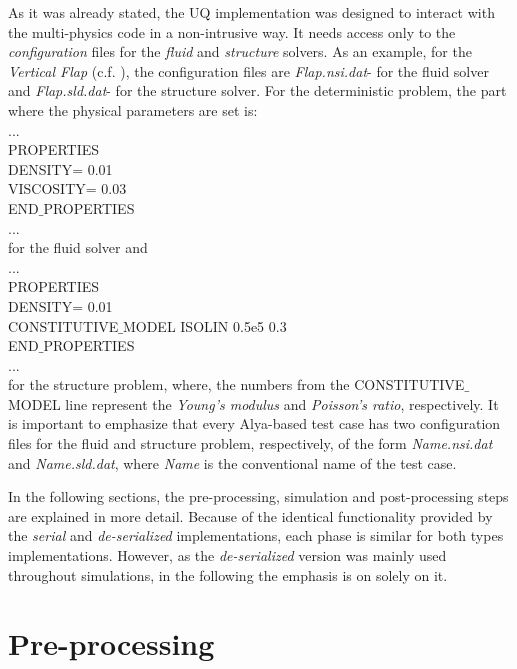 	As it was already stated, the UQ implementation was designed to interact with the multi-physics code in a non-intrusive way. It needs access only to the \emph{configuration} files for the \emph{fluid} and \emph{structure} solvers. As an example, for the \emph{Vertical Flap} (c.f. ), the configuration files are \emph{Flap.nsi.dat}- for the fluid solver and \emph{Flap.sld.dat}- for the structure solver. For the deterministic problem, the part where the physical parameters are set is:
\\
...
\\
 PROPERTIES \\
         DENSITY=    0.01 \\
         VISCOSITY=  0.03 \\
 END$\_$PROPERTIES \\
 ... \\
for the fluid solver and
\\
...
\\
 PROPERTIES \\
        DENSITY=             0.01 \\
  		CONSTITUTIVE$\_$MODEL   ISOLIN  0.5e5  0.3 \\
 END$\_$PROPERTIES \\
 ... \\
for the structure problem, where, the numbers from the CONSTITUTIVE$\_$MODEL line represent the \emph{Young's modulus} and \emph{Poisson's ratio}, respectively. It is important to emphasize that every Alya-based test case has two configuration files for the fluid and structure problem, respectively, of the form \emph{Name.nsi.dat} and \emph{Name.sld.dat}, where \emph{Name} is the conventional name of the test case. 
\newline

	In the following sections, the pre-processing, simulation and post-processing steps are explained in more detail. Because of the identical functionality provided by the \emph{serial} and \emph{de-serialized} implementations, each phase is similar for both types implementations. However, as the \emph{de-serialized} version was mainly used throughout simulations, in the following the emphasis is on solely on it.
\section{Pre-processing}
\label{sec:Pre-processing} 
	
